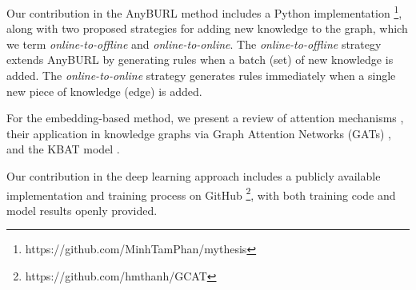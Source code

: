 Our contribution in the AnyBURL method includes a Python implementation \footnote{https://github.com/MinhTamPhan/mythesis}, along with two proposed strategies for adding new knowledge to the graph, which we term \textit{online-to-offline} and \textit{online-to-online}. The \textit{online-to-offline} strategy extends AnyBURL by generating rules when a batch (set) of new knowledge is added. The \textit{online-to-online} strategy generates rules immediately when a single new piece of knowledge (edge) is added.

For the embedding-based method, we present a review of attention mechanisms \cite{vaswani2017attention}, their application in knowledge graphs via Graph Attention Networks (GATs) \cite{velivckovic2017graph}, and the KBAT model \cite{nathani2019learning}.

Our contribution in the deep learning approach includes a publicly available implementation and training process on GitHub \footnote{https://github.com/hmthanh/GCAT}, with both training code and model results openly provided.

